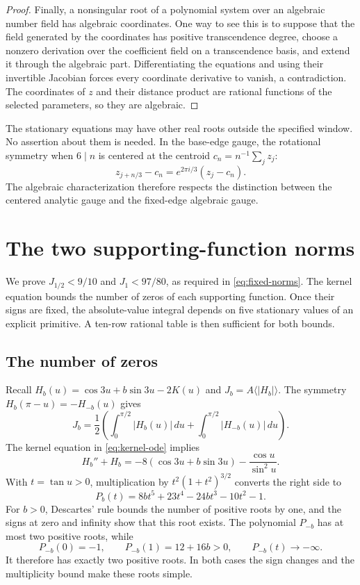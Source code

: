 \documentclass[11pt,reqno]{amsart}
\numberwithin{equation}{section}
\theoremstyle{definition}
\theoremstyle{remark}
\newcommand{\ac}[1]{\langle #1\rangle}
\begin{document}
\begin{proof}
Finally, a nonsingular root of a polynomial system over an algebraic number field has algebraic coordinates. One way to see this is to suppose that the field generated by the coordinates has positive transcendence degree, choose a nonzero derivation over the coefficient field on a transcendence basis, and extend it through the algebraic part. Differentiating the equations and using their invertible Jacobian forces every coordinate derivative to vanish, a contradiction. The coordinates of $z$ and their distance product are rational functions of the selected parameters, so they are algebraic.
\end{proof}

The stationary equations may have other real roots outside the specified window. No assertion about them is needed. In the base-edge gauge, the rotational symmetry when $6\mid n$ is centered at the centroid $c_n=n^{-1}\sum_jz_j$:
\[
 z_{j+n/3}-c_n=e^{2\pi i/3}(z_j-c_n).
\]
The algebraic characterization therefore respects the distinction between the centered analytic gauge and the fixed-edge algebraic gauge.


\appendix
\section{The two supporting-function norms}\label{app:fixed-duals}
We prove $J_{1/2}<9/10$ and $J_1<97/80$, as required in \eqref{eq:fixed-norms}. The kernel equation bounds the number of zeros of each supporting function. Once their signs are fixed, the absolute-value integral depends on five stationary values of an explicit primitive. A ten-row rational table is then sufficient for both bounds.

\subsection{The number of zeros}
Recall $H_b(u)=\cos3u+b\sin3u-2K(u)$ and $J_b=A\ac{|H_b|}$. The symmetry $H_b(\pi-u)=-H_{-b}(u)$ gives
\begin{equation}\label{eq:dual-half-interval}
 J_b=\frac12\left(\int_0^{\pi/2}|H_b(u)|\,du
                     +\int_0^{\pi/2}|H_{-b}(u)|\,du\right).
\end{equation}
The kernel equation in \eqref{eq:kernel-ode} implies
\[
 H_b''+H_b=-8(\cos3u+b\sin3u)-\frac{\cos u}{\sin^2u}.
\]
With $t=\tan u>0$, multiplication by $t^2(1+t^2)^{3/2}$ converts the right side to
\begin{equation}\label{eq:dual-polynomial}
 P_b(t)=8bt^5+23t^4-24bt^3-10t^2-1.
\end{equation}
For $b>0$, Descartes' rule bounds the number of positive roots by one, and the signs at zero and infinity show that this root exists. The polynomial $P_{-b}$ has at most two positive roots, while
\[
 P_{-b}(0)=-1,\qquad P_{-b}(1)=12+16b>0,\qquad
 P_{-b}(t)\longrightarrow-\infty.
\]
It therefore has exactly two positive roots. In both cases the sign changes and the multiplicity bound make these roots simple.
\end{document}
